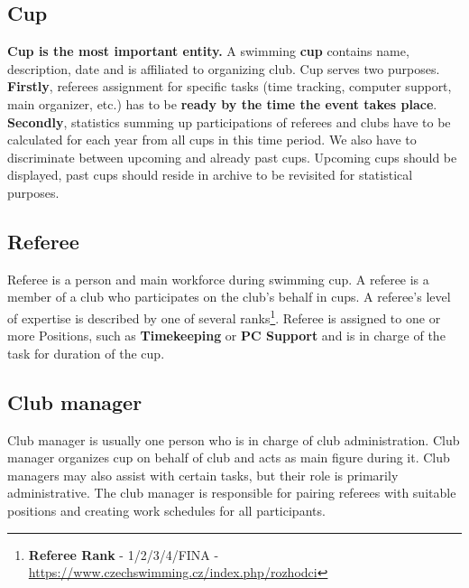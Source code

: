 \subsection*{Cup}
\textbf{Cup is the most important entity.} A swimming \textbf{cup} contains name, description, date and is affiliated to organizing club. Cup serves two purposes. \textbf{Firstly}, referees assignment for specific tasks (time tracking, computer support, main organizer, etc.) has to be \textbf{ready by the time the event takes place}. \textbf{Secondly}, statistics summing up participations of referees and clubs have to be calculated for each year from all cups in this time period. We also have to discriminate between upcoming and already past cups. Upcoming cups should be displayed, past cups should reside in archive to be revisited for statistical purposes.

\subsection*{Referee}
Referee is a person and main workforce during swimming cup. A referee is a member of a club who participates on the club's behalf in cups. A referee's level of expertise is described by one of several ranks\footnote{\textbf{Referee Rank} - 1/2/3/4/FINA - \url{https://www.czechswimming.cz/index.php/rozhodci}}. Referee is assigned to one or more Positions, such as \textbf{Timekeeping} or \textbf{PC Support} and is in charge of the task for duration of the cup. 
\subsection*{Club manager}
Club manager is usually one person who is in charge of club administration. Club manager organizes cup on behalf of club and acts as main figure during it. Club managers may also assist with certain tasks, but their role is primarily administrative. The club manager is responsible for pairing referees with suitable positions and creating work schedules for all participants.
